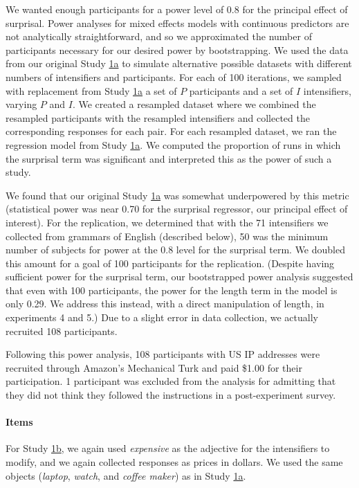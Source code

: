 \documentclass[10pt,letterpaper]{article}
\newcommand{\w}[1]{\emph{#1}}
\begin{document}
We wanted enough participants for a power level of 0.8 for the principal effect of surprisal.
Power analyses for mixed effects models with continuous predictors are not analytically straightforward, and so we approximated the number of participants necessary for our desired power by bootstrapping.
We used the data from our original Study \hyperref[sec:study1a]{1a} to simulate alternative possible datasets with different numbers of intensifiers and participants.
For each of 100 iterations, we sampled with replacement from Study \hyperref[sec:study1a]{1a} a set of $P$ participants and a set of $I$ intensifiers, varying $P$ and $I$.
We created a resampled dataset where we combined the resampled participants with the resampled intensifiers and collected the corresponding responses for each pair.
For each resampled dataset, we ran the regression model from Study \hyperref[sec:study1a]{1a}.
We computed the proportion of runs in which the surprisal term was significant and interpreted this as the power of such a study.

We found that our original Study \hyperref[sec:study1a]{1a} was somewhat underpowered by this metric (statistical power was near 0.70 for the surprisal regressor, our principal effect of interest).
For the replication, we determined that with the 71 intensifiers we collected from grammars of English (described below), 50 was the minimum number of subjects for power at the 0.8 level for the surprisal term.
We doubled this amount for a goal of 100 participants for the replication.
(Despite having sufficient power for the surprisal term, our bootstrapped power analysis suggested that even with 100 participants, the power for the length term in the model is only 0.29. We address this instead, with a direct manipulation of length, in experiments 4 and 5.)
Due to a slight error in data collection, we actually recruited 108 participants.

Following this power analysis, 108 participants with US IP addresses were recruited through Amazon’s Mechanical Turk and paid \$1.00 for their participation. 1 participant was excluded from the analysis for admitting that they did not think they followed the instructions in a post-experiment survey.

\paragraph{Items}

For Study \hyperref[sec:study1b]{1b}, we again used \w{expensive} as the adjective for the intensifiers to modify, and we again collected responses as prices in dollars.
We used the same objects (\w{laptop}, \w{watch}, and \w{coffee maker}) as in Study  \hyperref[sec:study1a]{1a}.
\end{document}
